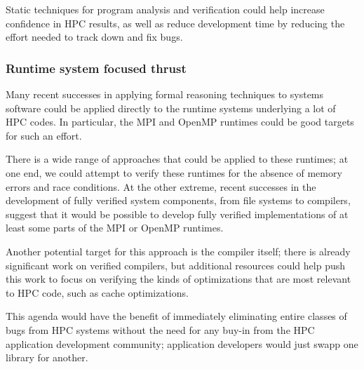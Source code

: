 \newcommand{\skc}[1]{}

Static techniques for program analysis and verification could help increase confidence in HPC results, as well as reduce development time by reducing the effort needed to track down and fix bugs. 
%

\subsubsection{Runtime system focused thrust}
\label{subsec:rt}


Many recent successes in applying formal reasoning techniques to systems software could be applied directly to the runtime systems underlying a lot of HPC codes. In particular, the MPI and OpenMP runtimes could be good targets for such an effort. 



There is a wide range of approaches that could be applied to these runtimes; at one end, we could attempt to verify these runtimes for the absence of memory errors and race conditions. At the other extreme, recent successes in the development of fully verified system components, from file systems to compilers, suggest that it would be possible to develop fully verified implementations of at least some parts of the MPI or OpenMP runtimes. 

Another potential target for this approach is the compiler itself; there is already significant work on verified compilers, but additional resources could help push this work to focus on verifying the kinds of optimizations that are most relevant to HPC code, such as cache optimizations.

This agenda would have the benefit of immediately eliminating entire classes of bugs from HPC systems without the need for any buy-in from the HPC application development community; application developers would just  swapp one library for another. 

